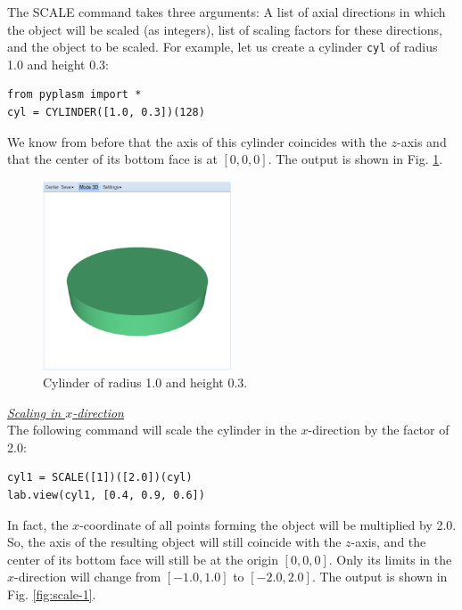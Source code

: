 \documentclass{article}
\begin{document}
The SCALE command takes three arguments: A list of axial directions in which 
the object will be scaled (as integers), list of scaling factors for these 
directions, and the object to be scaled. For example, let us create a cylinder 
{\tt cyl} of radius 1.0 and height 0.3:

\begin{verbatim}
from pyplasm import *
cyl = CYLINDER([1.0, 0.3])(128)
\end{verbatim}
We know from before that the axis of this cylinder coincides with the $z$-axis 
and that the center of its bottom face is at $[0, 0, 0]$. The output is shown in Fig. \ref{fig:scale-0}.

\begin{figure}[!ht]
\begin{center}
\includegraphics[width=0.5\textwidth]{img/scale-0.png}
\end{center}
\vspace{-2mm}
\caption{Cylinder of radius 1.0 and height 0.3.}
\label{fig:scale-0}
\end{figure}

\noindent
\underline{\em Scaling in $x$-direction}\\

The following command will 
scale the cylinder in the $x$-direction by the factor of 2.0: 

\begin{verbatim}
cyl1 = SCALE([1])([2.0])(cyl)
lab.view(cyl1, [0.4, 0.9, 0.6])
\end{verbatim}
In fact, the $x$-coordinate of all points forming 
the object will be multiplied by 2.0. So, the axis of the resulting object will still
coincide with the $z$-axis, and the center of its bottom face will
still be at the origin $[0, 0, 0]$. Only its limits in the $x$-direction will change 
from $[-1.0, 1.0]$ to $[-2.0, 2.0]$.
The output is shown in Fig. \ref{fig:scale-1}.
\end{document}
